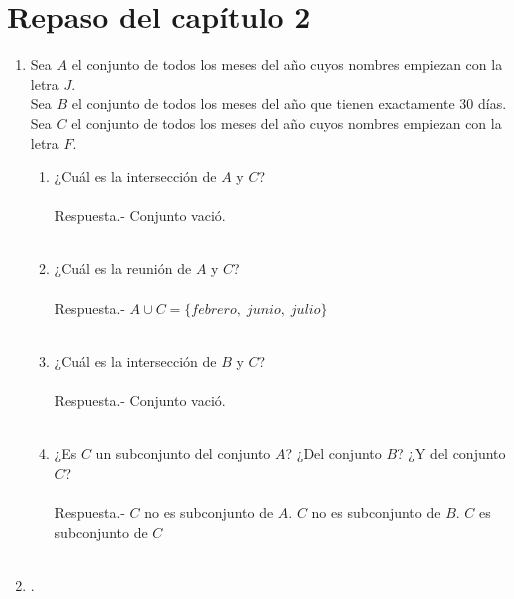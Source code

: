 \section{Repaso del capítulo 2}
\begin{enumerate}
\item Sea $A$ el conjunto de todos los meses del año cuyos nombres empiezan con la letra $J$.\\
Sea $B$ el conjunto de todos los meses del año que tienen exactamente 30 días.\\
Sea $C$ el conjunto de todos los meses del año cuyos nombres empiezan con la letra $F$.
\begin{enumerate}[\bfseries (a)]
\item ¿Cuál es la intersección de $A$ y $C$? \\\\
Respuesta.- \; Conjunto vació.\\\\
\item ¿Cuál es la reunión de $A$ y $C$?\\\\
Respuesta.- \; $A \cup C = \lbrace febrero, \; junio, \; julio \rbrace$\\\\
\item ¿Cuál es la intersección de $B$ y $C$?\\\\
Respuesta.- \; Conjunto vació.\\\\
\item ¿Es $C$ un subconjunto del conjunto $A$? ¿Del conjunto $B$? ¿Y del conjunto $C$?\\\\
Respuesta.- \; $C$ no es subconjunto de $A$. $C$ no es subconjunto de $B$. $C$ es subconjunto de $C$\\\\
\end{enumerate}

\item .

\begin{center}
\end{center}


\end{enumerate}
